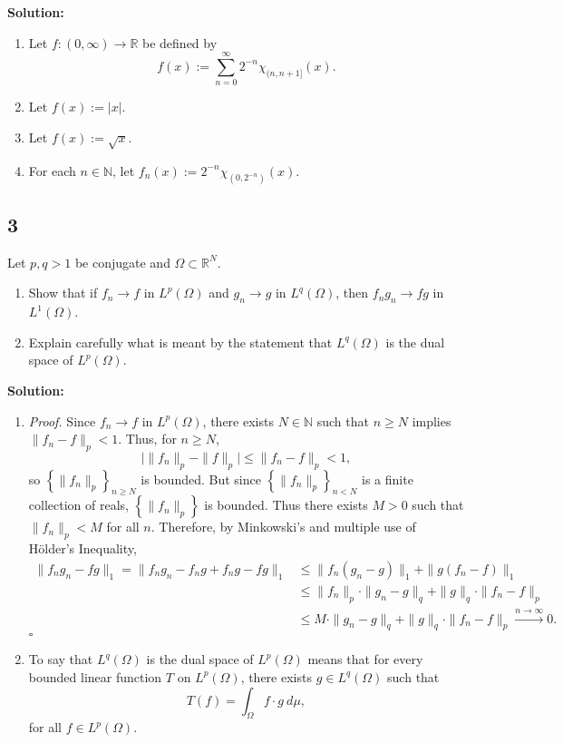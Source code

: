 \documentclass[12pt]{article}
\newcounter{ProofCounter}
\newenvironment{Proof}{\stepcounter{ProofCounter}\textit{Proof.}}{\hfill$\square$}
\begin{document}
{\bf Solution:}
\begin{enumerate}[label=(\alph*)]
\item Let $f : (0,\infty) \rightarrow \mathbb{R}$ be defined by 
\[ f(x) := \sum_{n=0}^{\infty}2^{-n}\chi_{(n,n+1]}(x). \]
\item Let $f(x) := |x|$.
\item Let $f(x) := \sqrt{x}$.
\item For each $n \in \mathbb{N}$, let $f_{n}(x) := 2^{-n}\chi_{(0,2^{-n})}(x)$.
\end{enumerate}


\newpage
\subsection*{3}
Let $p, q > 1$ be conjugate and $\Omega \subset \mathbb{R}^{N}$.
\begin{enumerate}[label=(\alph*)]
\item Show that if $f_{n} \rightarrow f$ in $L^{p}(\Omega)$ and $g_{n} \rightarrow g$ in $L^{q}(\Omega)$, then $f_{n}g_{n} \rightarrow fg$ in
$L^{1}(\Omega)$.
\item Explain carefully what is meant by the statement that $L^{q}(\Omega)$ is the dual space of $L^{p}(\Omega)$.
\end{enumerate}

{\bf Solution:}
\begin{enumerate}[label=(\alph*)]
\item 
\begin{Proof}
Since $f_{n} \rightarrow f$ in $L^{p}(\Omega)$, there exists $N \in \mathbb{N}$ such that $n \geq N$ implies $\|f_{n} - f\|_{p} < 1$. Thus, for $n
\geq N$,
\[ \bigg| \|f_{n}\|_{p} - \|f\|_{p}\bigg| \leq \|f_{n} - f\|_{p} < 1, \]
so $\left\{ \|f_{n}\|_{p} \right\}_{n\geq N}$ is bounded.
But since $\left\{ \|f_{n}\|_{p} \right\}_{n<N}$ is a finite collection of reals, $\left\{ \|f_{n}\|_{p} \right\}$ is bounded. 
Thus there exists $M > 0$ such that $\|f_{n}\|_{p} < M$ for all $n$. Therefore, by Minkowski's and multiple use of H\"{o}lder's Inequality,
\begin{align*}
\|f_{n}g_{n} - fg\|_{1} = \|f_{n}g_{n} - f_{n}g + f_{n}g - fg\|_{1} & \leq \|f_{n}(g_{n} - g)\|_{1} + \|g(f_{n} - f)\|_{1} \\
& \leq \|f_{n}\|_{p}\cdot\|g_{n} - g\|_{q} + \|g\|_{q}\cdot\|f_{n} - f\|_{p} \\
& \leq M\cdot\|g_{n} - g\|_{q} + \|g\|_{q}\cdot\|f_{n} - f\|_{p} \stackrel{n\rightarrow\infty}{\longrightarrow} 0.
\end{align*}
\end{Proof}

\item To say that $L^{q}(\Omega)$ is the dual space of $L^{p}(\Omega)$ means that for every bounded linear function $T$ on $L^{p}(\Omega)$, there exists 
$g \in L^{q}(\Omega)$ such that
\[ T(f) = \int_{\Omega} f\cdot g\ d\mu, \]
for all $f \in L^{p}(\Omega)$.
\end{enumerate}
\end{document}
